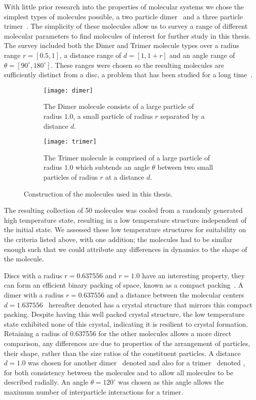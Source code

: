 With little prior research into the properties of molecular systems we chose the simplest types of molecules possible, a two particle dimer~ and a three particle trimer~. The simplicity of these molecules allow us to survey a range of different molecular parameters to find molecules of interest for further study in this thesis. The survey included both the Dimer and Trimer molecule types over a radius range $r = [0.5,1]$, a distance range of $d = [1,1+r]$ and an angle range of $\theta = [90^\circ,180^\circ]$. These ranges were chosen so the resulting molecules are sufficiently distinct from a disc, a problem that has been studied for a long time~\cite{verlet:67}.

\begin{figure}
    \centering
    \begin{subfigure}[t]{0.48\textwidth}
        \texttt{[image: dimer]}
        \caption{The Dimer molecule consists of a large particle of radius $1.0$, a small particle of radius $r$ separated by a distance $d$.}
        \label{fig:dimer}
    \end{subfigure}\hfill
    \begin{subfigure}[t]{0.48\textwidth}
        \texttt{[image: trimer]}
        \caption{The Trimer molecule is comprised of a large particle of radius $1.0$ which subtends an angle $\theta$ between two small particles of radius $r$ at a distance $d$.}
        \label{fig:trimer}
    \end{subfigure}
    \caption{Construction of the molecules used in this thesis.}
    \label{fig:construction}
\end{figure}

The resulting collection of 50 molecules was cooled from a randomly generated high temperature state, resulting in a low temperature structure independent of the initial state. We assessed these low temperature structures for suitability on the criteria listed above, with one addition; the molecules had to be similar enough such that we could attribute any differences in dynamics to the shape of the molecule.

Discs with a radius $r=0.637556$ and $r=1.0$ have an interesting property, they can form an efficient binary packing of space, known as a compact packing~\appref{}. A dimer with a radius $r= 0.637556$ and a distance between the molecular centers $d= 1.637556$~ hereafter denoted \dcon has a crystal structure that mirrors this compact packing. Despite \dcon having this well packed crystal structure, the low temperature state exhibited none of this crystal, indicating it is resilient to crystal formation. Retaining a radius of 0.637556 for the other molecules allows a more direct comparison, any differences are due to properties of the arrangement of particles, their shape, rather than the size ratios of the constituent particles. A distance $d= 1.0$ was chosen for another dimer~ denoted \done and also for a trimer~ denoted \tri, for both consistency between the molecules and to allow all molecules to be described radially. An angle $\theta=120^\circ$ was chosen as this angle allows the maximum number of interparticle interactions for a trimer.

